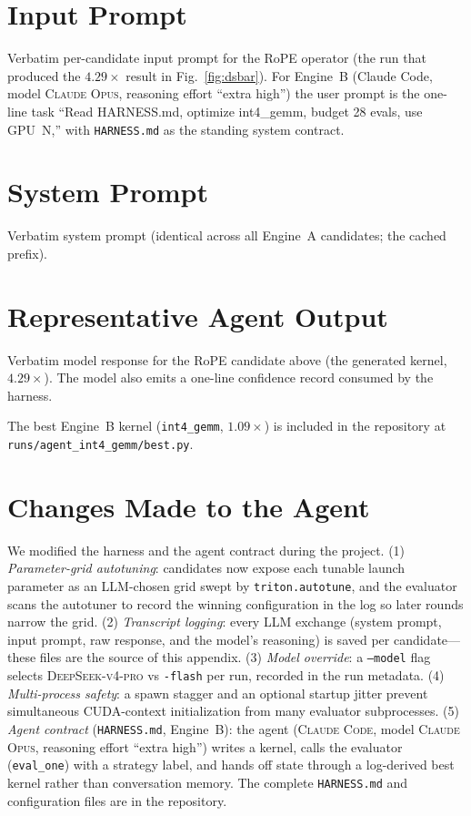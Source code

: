 \documentclass[conference]{IEEEtran}
\begin{document}
\section{Input Prompt}
\label{app:input}
Verbatim per-candidate input prompt for the RoPE operator (the run that produced
the $4.29\times$ result in Fig.~\ref{fig:dsbar}). For Engine~B (Claude Code, model
\textsc{Claude Opus}, reasoning effort ``extra high'') the user prompt is the
one-line task ``Read HARNESS.md, optimize int4\_gemm, budget 28 evals, use
GPU~N,'' with \texttt{HARNESS.md} as the standing system contract.


\section{System Prompt}
\label{app:system}
Verbatim system prompt (identical across all Engine~A candidates; the cached
prefix).


\section{Representative Agent Output}
\label{app:output}
Verbatim model response for the RoPE candidate above (the generated kernel,
$4.29\times$). The model also emits a one-line confidence record consumed by the
harness.


\noindent The best Engine~B kernel (\texttt{int4\_gemm}, $1.09\times$) is included
in the repository at \texttt{runs/agent\_int4\_gemm/best.py}.

\section{Changes Made to the Agent}
We modified the harness and the agent contract during the project. (1)
\emph{Parameter-grid autotuning}: candidates now expose each tunable launch
parameter as an LLM-chosen grid swept by \texttt{triton.autotune}, and the
evaluator scans the autotuner to record the winning configuration in the log so
later rounds narrow the grid. (2) \emph{Transcript logging}: every LLM exchange
(system prompt, input prompt, raw response, and the model's reasoning) is saved
per candidate---these files are the source of this appendix. (3) \emph{Model
override}: a \texttt{--model} flag selects \textsc{DeepSeek-v4-pro} vs
\texttt{-flash} per run, recorded in the run metadata. (4) \emph{Multi-process
safety}: a spawn stagger and an optional startup jitter prevent simultaneous
CUDA-context initialization from many evaluator subprocesses. (5) \emph{Agent
contract} (\texttt{HARNESS.md}, Engine~B): the agent (\textsc{Claude Code}, model
\textsc{Claude Opus}, reasoning effort ``extra high'') writes a kernel, calls the
evaluator (\texttt{eval\_one}) with a strategy label, and hands off state through
a log-derived best kernel rather than conversation memory. The complete
\texttt{HARNESS.md} and configuration files are in the repository.
\end{document}
